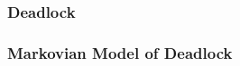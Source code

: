 \documentclass{beamer}
\begin{document}
\begin{frame}
    \frametitle{Deadlock}
    \begin{figure}
    
    \end{figure}
\end{frame}

\begin{frame}
    \begin{figure}
    
    \end{figure}
\end{frame}

\begin{frame}
    \frametitle{Markovian Model of Deadlock}
    \newline
\end{frame}
\end{document}

